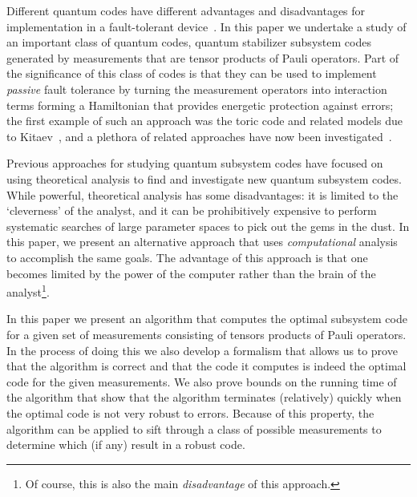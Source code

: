 \documentclass[twocolumn,showpacs,preprintnumbers,amsmath,amssymb,nofootinbib,pra,floatfix]{revtex4-1}
\begin{document}
Different quantum codes have different advantages and disadvantages for implementation in a fault-tolerant device~\cite{Cross:07a}.  In this paper we undertake a study of an important class of quantum codes, quantum stabilizer subsystem codes~\cite{Poulin:05a,Kribs:05a,Kribs:05b,Kribs:06a} generated by measurements that are tensor products of Pauli operators.  Part of the significance of this class of codes is that they can be used to implement \emph{passive} fault tolerance by turning the measurement operators into interaction terms forming a Hamiltonian that provides energetic protection against errors;  the first example of such an approach was the toric code and related models due to Kitaev~\cite{Kitaev:97c,Kitaev:03a}, and a plethora of related approaches have now been investigated~\cite{Barnes:00a,Bacon:01b,Jordan:05a,Weinstein:05b,Bacon:06a,Bacon:08b,Nayak:08a,Bombin:09a,Chesi:10a}.

Previous approaches for studying quantum subsystem codes have focused on using theoretical analysis to find and investigate new quantum subsystem codes.  While powerful, theoretical analysis has some disadvantages:  it is limited to the `cleverness' of the analyst, and it can be prohibitively expensive to perform systematic searches of large parameter spaces to pick out the gems in the dust.  In this paper, we present an alternative approach that uses \emph{computational} analysis to accomplish the same goals.  The advantage of this approach is that one becomes limited by the power of the computer rather than the brain of the analyst\footnote{Of course, this is also the main \emph{disadvantage} of this approach.}.

In this paper we present an algorithm that computes the optimal subsystem code for a given set of measurements consisting of tensors products of Pauli operators.  In the process of doing this we also develop a formalism that allows us to prove that the algorithm is correct and that the code it computes is indeed the optimal code for the given measurements.  We also prove bounds on the running time of the algorithm that show that the algorithm terminates (relatively) quickly when the optimal code is not very robust to errors.  Because of this property, the algorithm can be applied to sift through a class of possible measurements to determine which (if any) result in a robust code.
\end{document}
